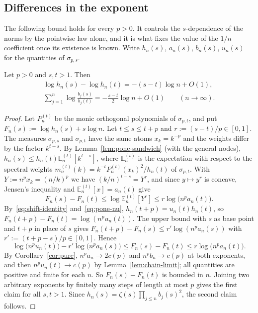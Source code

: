 \subsection{Differences in the exponent}\label{sec:pone-sdiff}

The following bound holds for every $p>0$. It controls the $s$-dependence of the norms by the pointwise law alone, and
it is what fixes the value of the $1/n$ coefficient once its existence is known. Write $h_n(s)$, $a_n(s)$, $b_n(s)$,
$u_n(s)$ for the quantities of $\sigma_{p,s}$.

\begin{lemma}[Differences in $s$]\label{lem:pone-sdiff}
Let $p>0$ and $s,t>1$. Then
\begin{gather*}
  \log h_n(s)-\log h_n(t)=-(s-t)\log n+O(1),\\
  \sum_{j=1}^n\log\frac{b_j(s)}{b_j(t)}=-\frac{s-t}2\log n+O(1)\qquad(n\to\infty).
\end{gather*}
\end{lemma}

\begin{proof}
Let $P_n^{(t)}$ be the monic orthogonal polynomials of $\sigma_{p,t}$, and put $F_n(s):=\log h_n(s)+s\log n$. Let $t\le s\le t+p$ and $r:=(s-t)/p\in[0,1]$. The measures $\sigma_{p,s}$ and
$\sigma_{p,t}$ have the same atoms $x_k=k^{-p}$ and the weights differ by the factor $k^{t-s}$. By
Lemma~\ref{lem:pone-sandwich} (with the general nodes), $h_n(s)\le h_n(t)\mathbb E_n^{(t)}[k^{t-s}]$, where
$\mathbb E_n^{(t)}$ is the expectation with respect to the spectral weights $m_n^{(t)}(k)=k^{-t}P_n^{(t)}(x_k)^2/h_n(t)$ of
$\sigma_{p,t}$. With $Y:=n^px_k=(n/k)^p$ we have $(k/n)^{t-s}=Y^r$, and since $y\mapsto y^r$ is concave, Jensen's
inequality and $\mathbb E_n^{(t)}[x]=a_n(t)$ give
\[
  F_n(s)-F_n(t)\le\log\mathbb E_n^{(t)}[Y^r]\le r\log\bigl(n^pa_n(t)\bigr).
\]
By~\eqref{eq:shift-identity} and~\eqref{eq:pone-nu}, $h_n(t+p)=u_n(t)h_n(t)$, so $F_n(t+p)-F_n(t)=\log(n^pu_n(t))$. The
upper bound with $s$ as base point and $t+p$ in place of $s$ gives $F_n(t+p)-F_n(s)\le r'\log(n^pa_n(s))$ with
$r':=(t+p-s)/p\in[0,1]$. Hence
\[
  \log\bigl(n^pu_n(t)\bigr)-r'\log\bigl(n^pa_n(s)\bigr)\le F_n(s)-F_n(t)\le r\log\bigl(n^pa_n(t)\bigr).
\]
By Corollary~\ref{cor:pure}, $n^pa_n\to2c(p)$ and $n^pb_n\to c(p)$ at both exponents, and then $n^pu_n(t)\to c(p)$ by
Lemma~\ref{lem:chain-limit}; all quantities are positive and finite for each $n$. So $F_n(s)-F_n(t)$ is bounded in $n$.
Joining two arbitrary exponents by finitely many steps of length at most $p$ gives the first claim for all $s,t>1$.
Since $h_n(s)=\zeta(s)\prod_{j\le n}b_j(s)^2$, the second claim follows.
\end{proof}

